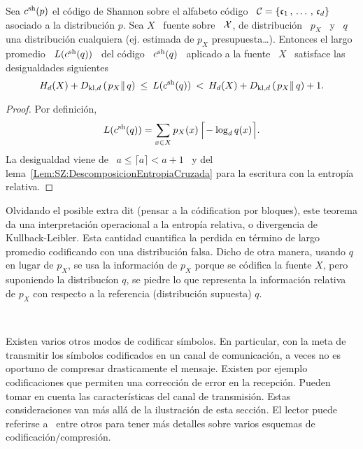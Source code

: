 \begin{teorema}
\label{Teo:SZ:CodigoFalsoShannon}
%
Sea $c^{\mathrm{sh}}(p)$  el c\'odigo  de Shannon sobre  el alfabeto  c\'odigo \ $\mathcal{C}  = \{
\mathfrak{c}_1 \, , \, \ldots \, ,  \, \mathfrak{c}_d \}$ asociado a la distribuci\'on $p$.  Sea
$X$  \  fuente  sobre  \  $\mathcal{X}$,  de  distribuci\'on  \  $p_X$  \  y  \  $q$  una
distribuci\'on cualquiera (ej.   estimada de $p_X$ presupuesta\ldots).  Entonces
el largo promedio  \ $L(c^{\mathrm{sh}}(q))$ \ del c\'odigo \ $c^{\mathrm{sh}}(q)$  \ aplicado a la
fuente \ $X$ \ satisface las desigualdades siguientes
  \[
  H_d(X) +  D_{\mathrm{kl},d}\left( \left.  p_X \right\| q  \right) \:  \le \:
  L(c^{\mathrm{sh}}(q)) \: < \: H_d(X)  + D_{\mathrm{kl},d}\left( \left. p_X \right\| q
  \right) + 1.
  \]
\end{teorema}
%
\begin{proof}
  Por definici\'on,
  \[
  L(c^{\mathrm{sh}}(q)) = \sum_{x \in X} p_X(x) \, \Big\lceil\! -\log_d q(x) \Big\rceil.
  \]
  La  desigualdad viene  de  \ $a  \le  \lceil  a \rceil  <  a +  1$  \ y  del
  lema~\ref{Lem:SZ:DescomposicionEntropiaCruzada}  para  la escritura   con  la
  entrop\'ia relativa.
\end{proof}
%
Olvidando el  posible extra dit (pensar  a la c\'odification  por bloques), este
teorema  da  una  interpretaci\'on  operacional  a  la  entrop\'ia  relativa,  o
divergencia  de  Kullback-Leibler.   Esta  cantidad  cuantifica  la  perdida  en
t\'ermino de largo  promedio codificando con una distribuci\'on  falsa. Dicho de
otra manera,  usando $q$  en lugar de  $p_X$, se  usa la informaci\'on  de $p_X$
porque se  c\'odifica la fuente $X$,  pero suponiendo la  distribuc\'ion $q$, se
piedre lo  que representa la  informaci\'on relativa de  $p_X$ con respecto  a la
referencia (distribuci\'on supuesta) $q$.

\

Existen varios otros  modos de codificar s\'imbolos. En  particular, con la meta
de transmitir los s\'imbolos codificados  en un canal de comunicaci\'on, a veces
no  es oportuno  de compresar  drasticamente  el mensaje.   Existen por  ejemplo
codificaciones que permiten una correcci\'on  de error en la recepci\'on. Pueden
tomar  en  cuenta  las  caracter\'isticas  del canal  de  transmisi\'on.   Estas
consideraciones  van m\'as  all\'a de  la ilustraci\'on  de esta  secci\'on.  El
lector puede referirse a~\cite{Ber74, Gal78, Say03, CovTho06, Rio07} entre otros
para tener m\'as detalles sobre varios esquemas de codificaci\'on/compresi\'on.

